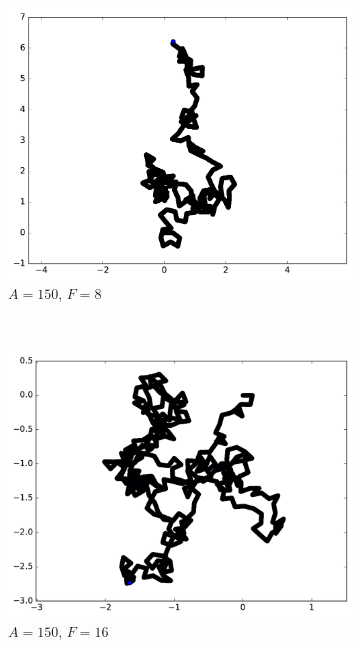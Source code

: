 \begin{appendices}
\begin{figure}[htbp]
\begin{subfigure}[t]{\subImgWmo}
			\includegraphics[width=\textwidth]{figures/ch3/synTraj_219_150_8}
			\caption[$A = 150$, $F=8$]{$A = 150$, $F=8$}
			\label{fig:synTraj_219_150_8}
		\end{subfigure}
		~
		\begin{subfigure}[t]{\subImgWmo}
			\centering
			\includegraphics[width=\textwidth]{figures/ch3/synTraj_219_150_16}
			\caption[$A = 150$, $F=16$]{$A = 150$, $F=16$}
			\label{fig:synTraj_219_150_16}
		\end{subfigure}
		~
		\begin{subfigure}[t]{\subImgWmo}
			\centering

\end{subfigure}
\end{figure}
\end{appendices}
